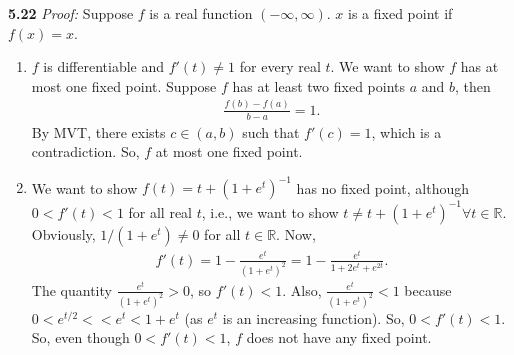 \documentclass[11pt]{article}
\begin{document}
\noindent \textbf{5.22}
\noindent \textit{Proof:} Suppose $f$ is a real function $(-\infty, \infty)$. $x$ is a fixed point if $f(x) = x$. 
\begin{enumerate}
	\item $f$ is differentiable and $f'(t) \neq 1$ for every real $t$. We want to show $f$ has at most one fixed point.  Suppose $f$ has at least two fixed points $a$ and $b$, then 
	\begin{align*}
	\frac{f(b) - f(a)}{b-a} = 1.
	\end{align*}
	By MVT, there exists $c\in (a,b)$ such that $f'(c) = 1$, which is a contradiction. So, $f$ at most one fixed point. 
	
	\item We want to show $f(t) = t + (1+e^t)^{-1}$ has no fixed point, although $0 < f'(t)< 1$ for all real $t$, i.e., we want to show $t \neq t + (1+e^t)^{-1} \forall t \in \mathbb{R}$. Obviously, $1/(1+e^t) \neq 0$ for all $t\in \mathbb{R}$. Now, 
	\begin{align*}
	f'(t) = 1 - \frac{e^t}{(1+e^t)^2} = 1 - \frac{e^t}{1+ 2e^t + e^{2t}}.
	\end{align*}
	The quantity $\frac{e^t}{(1+e^t)^2} >0$, so $f'(t) < 1$. Also, $\frac{e^t}{(1+e^t)^2} < 1$ because $0 < e^{t/2} < < e^t < 1+e^t$ (as $e^t$ is an increasing function). So, $0 < f'(t) < 1$. So, even though $0 < f'(t) < 1$, $f$ does not have any fixed point. 
	
	
	

\end{enumerate}
\end{document}
